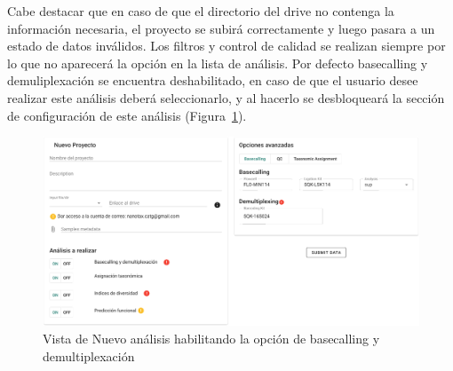 Cabe destacar que en caso de que el directorio del drive no contenga la información necesaria, el proyecto se subirá correctamente y luego pasara a un estado de datos inválidos.
Los filtros y control de calidad se realizan siempre por lo que no aparecerá la opción en la lista de análisis.
Por defecto basecalling y demuliplexación se encuentra deshabilitado, en caso de que el usuario desee realizar este análisis deberá seleccionarlo, y al hacerlo se desbloqueará la sección de configuración de este análisis (Figura~\ref{fig:app-new-analysis-basecallingON}).



\begin{figure}[H]
    \includegraphics[width=1\linewidth]{images/app/newAnalysis/new-analysis-basecallingON.png}

    \caption{Vista de Nuevo análisis habilitando la opción de basecalling y demultiplexación}
    \label{fig:app-new-analysis-basecallingON}
\end{figure}

